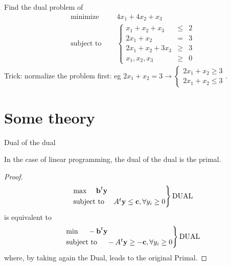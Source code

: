 \documentclass[c]{beamer}
\begin{document}
\begin{frame}{}
\begin{Exercise}
  Find the dual problem of
  \begin{equation*}
  \begin{aligned}
    \text{minimize } \quad & 4x_1 +4x_2+x_3 \\
    \text{subject to }\quad &
    \left\{
    \begin{array}{rcl}
      x_1+x_2+x_3 &\leq &2 \\
      2x_1+x_2 &= &3 \\
      2x_1+x_2+3x_3 &\geq &3 \\
      x_1,x_2,x_3 &\geq& 0
    \end{array}
    \right.
  \end{aligned}
\end{equation*}
Trick: normalize the problem first: eg $2x_1+x_2=3 \rightarrow \begin{cases}2x_1+x_2 \geq 3\\2x_1+x_2\leq 3\end{cases}$.
\end{Exercise}
\end{frame}

\section{Some theory}

\begin{frame}{Dual of the dual}
\begin{theorem}
  In the case of linear programming, the dual of the dual is the primal.
\end{theorem}
\begin{proof}
 \[
\begin{rcases}
\text{max }\quad\textbf{b}^t \textbf{y}\\
\text{subject to }\quad A^t\textbf{y}\leq \textbf{c}, \forall y_i\geq0
\end{rcases} \text{DUAL}
\]
is equivalent to
\[
\begin{rcases}
\text{min }\quad-\textbf{b}^t \textbf{y}\\
\text{subject to }\quad -A^t\textbf{y}\geq -\textbf{c}, \forall y_i\geq0
\end{rcases} \text{DUAL}
\]
where, by taking again the Dual, leads to the original Primal.
\end{proof}
\end{frame}
\end{document}
